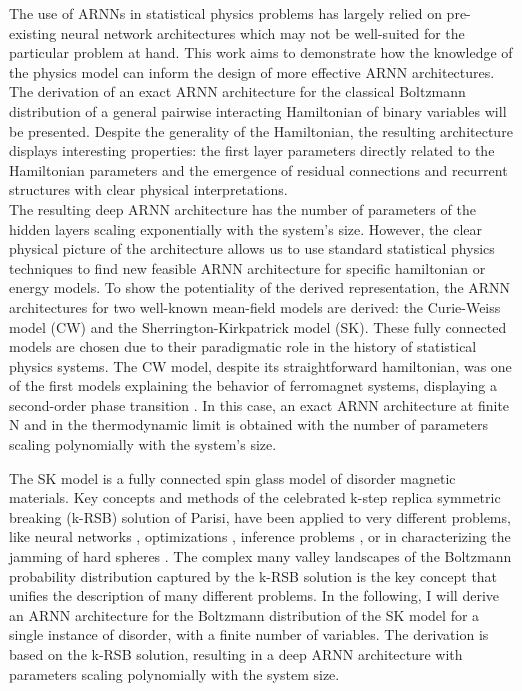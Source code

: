 \documentclass[aps,physrev,10pt,floatfix,reprint]{revtex4-2}
\begin{document}
The use of ARNNs in statistical physics problems has largely relied on pre-existing neural network architectures which may not be well-suited for the particular problem at hand. This work aims to demonstrate how the knowledge of the physics model can inform the design of more effective ARNN architectures. The derivation of an exact ARNN architecture for the classical Boltzmann distribution of a general pairwise interacting Hamiltonian of binary variables will be presented. Despite the generality of the Hamiltonian, the resulting architecture displays interesting properties: the first layer parameters directly related to the Hamiltonian parameters and the emergence of residual connections and recurrent structures with clear physical interpretations.\\
The resulting deep ARNN architecture has the number of parameters of the hidden layers scaling exponentially with the system's size. 
However, the clear physical picture of the architecture allows us to use standard statistical physics techniques to find new feasible ARNN architecture for specific hamiltonian or energy models. To show the potentiality of the derived representation, the ARNN architectures for two well-known mean-field models are derived: the Curie-Weiss model (CW) and the Sherrington-Kirkpatrick model (SK). These fully connected models are chosen due to their paradigmatic role in the history of statistical physics systems. The CW model, despite its straightforward hamiltonian, was one of the first models explaining the behavior of ferromagnet systems, displaying a second-order phase transition \cite{kadanoff2000statistical}. In this case, an exact ARNN architecture at finite N and in the thermodynamic limit is obtained with the number of parameters scaling polynomially with the system's size.

The SK model \cite{PhysRevLett.35.1792} is a fully connected spin glass model of disorder magnetic materials. 
Key concepts and methods of the celebrated \cite{Nobel2021} k-step replica symmetric breaking (k-RSB) solution \cite{PARISI1979203, PhysRevLett.43.1754} of Parisi, have been applied to very different problems, like neural networks \cite{Gardner_1987, PhysRevLett.55.1530}, optimizations \cite{doi:10.1126/science.1073287}, inference problems \cite{doi:10.1080/00018732.2016.1211393}, or in characterizing the jamming of hard spheres \cite{RevModPhys.82.789, PhysRevLett.102.195701}. The complex many valley landscapes of the Boltzmann probability distribution captured by the k-RSB solution is the key concept that unifies the description of many different problems. In the following, I will derive an ARNN architecture for the Boltzmann distribution of the SK model for a single instance of disorder, with a finite number of variables. The derivation is based on the k-RSB solution, resulting in a deep ARNN architecture with parameters scaling polynomially with the system size. \\
            
\end{document}
